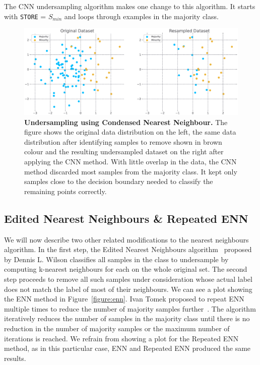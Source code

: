 The CNN undersampling algorithm makes one change to this algorithm. It starts with \texttt{STORE} =
$S_{min}$ and loops through examples in the majority class.

\begin{figure}
    \centering
    \includegraphics[width=\linewidth]{figures/cnn.eps}
    \caption{
        \textbf{Undersampling using Condensed Nearest Neighbour.} The figure shows the original
        data distribution on the left, the same data distribution after identifying samples to
        remove shown in brown colour and the resulting undersampled dataset on the right after
        applying the CNN method. With little overlap in the data, the CNN method discarded most
        samples from the majority class. It kept only samples close to the decision boundary needed
        to classify the remaining points correctly.
    }
    \label{figure:cnn}
\end{figure}


\subsection{Edited Nearest Neighbours \& Repeated ENN}
\label{subsection:enn}

We will now describe two other related modifications to the nearest neighbours algorithm. In the
first step, the Edited Nearest Neighbours algorithm~\cite{enn} proposed by Dennis L. Wilson
classifies all samples in the class to undersample by computing k-nearest neighbours for each on
the whole original set. The second step proceeds to remove all such samples under consideration
whose actual label does not match the label of most of their neighbours. We can see a plot showing
the ENN method in Figure~\ref{figure:enn}. Ivan Tomek proposed to repeat ENN multiple times to
reduce the number of majority samples further~\cite{repeated-enn}. The algorithm iteratively
reduces the number of samples in the majority class until there is no reduction in the number of
majority samples or the maximum number of iterations is reached. We refrain from showing a plot for
the Repeated ENN method, as in this particular case, ENN and Repeated ENN produced the same
results.

